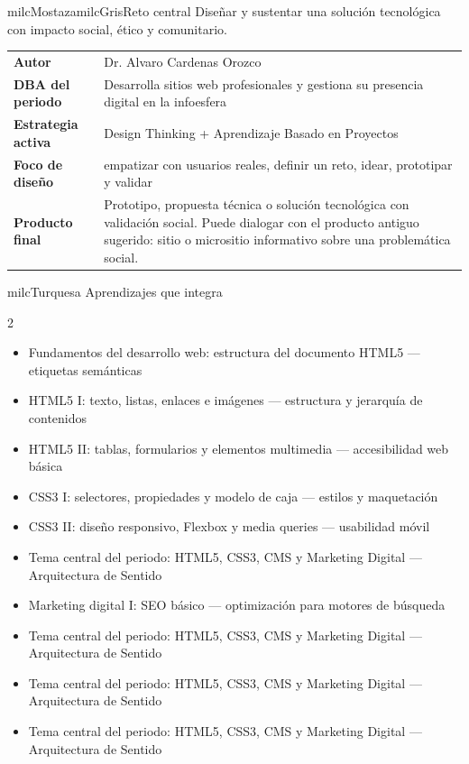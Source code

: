 \documentclass[11pt,letterpaper]{article}
\begin{document}
\begin{softbox}{milcMostaza}{milcGris}{Reto central}
Diseñar y sustentar una solución tecnológica con impacto social, ético y comunitario.
\end{softbox}

\begin{tabularx}{\textwidth}{>{\bfseries}p{3.4cm}X}
\rowcolor{milcMagenta!12}Autor & Dr. Alvaro Cardenas Orozco\\
DBA del periodo & Desarrolla sitios web profesionales y gestiona su presencia digital en la infoesfera\\
Estrategia activa & Design Thinking + Aprendizaje Basado en Proyectos\\
Foco de diseño & empatizar con usuarios reales, definir un reto, idear, prototipar y validar\\
Producto final & Prototipo, propuesta técnica o solución tecnológica con validación social. Puede dialogar con el producto antiguo sugerido: sitio o micrositio informativo sobre una problemática social.\\
\end{tabularx}

\begin{titlebox}{milcTurquesa}
Aprendizajes que integra
\end{titlebox}
\begin{multicols}{2}
\begin{itemize}[leftmargin=*]
\item Fundamentos del desarrollo web: estructura del documento HTML5 — etiquetas semánticas
\item HTML5 I: texto, listas, enlaces e imágenes — estructura y jerarquía de contenidos
\item HTML5 II: tablas, formularios y elementos multimedia — accesibilidad web básica
\item CSS3 I: selectores, propiedades y modelo de caja — estilos y maquetación
\item CSS3 II: diseño responsivo, Flexbox y media queries — usabilidad móvil
\item Tema central del periodo: HTML5, CSS3, CMS y Marketing Digital — Arquitectura de Sentido
\item Marketing digital I: SEO básico — optimización para motores de búsqueda
\item Tema central del periodo: HTML5, CSS3, CMS y Marketing Digital — Arquitectura de Sentido
\item Tema central del periodo: HTML5, CSS3, CMS y Marketing Digital — Arquitectura de Sentido
\item Tema central del periodo: HTML5, CSS3, CMS y Marketing Digital — Arquitectura de Sentido
\end{itemize}
\end{multicols}
\end{document}

